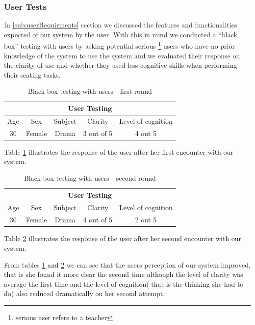 \subsubsection{User Tests} \label{sub:user-testing}
In \ref{sub:userRequirments} section we discussed the features and functionalities expected of our system by the user. With this in mind we conducted a ``black box'' testing with users by asking potential serious \footnote{ serious user refers to a teacher} users who have no prior knowledge of the system to use the system and we evaluated their response on the clarity of use and whether they used less cognitive skills when performing their seating tasks.
\begin{table}
    \begin{tabular}{|c|c|c|c|c|}
        \hline
        \multicolumn{5}{|c|}{User Testing} \\
        \hline
        Age & Sex & Subject & Clarity & Level of cognition \\
        \hline
        30  & Female & Drama & 3 out of 5 & 4 out 5\\
        \hline
    \end{tabular}
    \caption{\label{tab:user-testing1} Black box testing with users - first round}
\end{table}


Table \ref{tab:user-testing1} illustrates the response of the user after her first encounter with our system.
\begin{table}
    \begin{tabular}{|c|c|c|c|c|}
        \hline
        \multicolumn{5}{|c|}{User Testing} \\
        \hline
        Age & Sex & Subject & Clarity & Level of cognition \\
        \hline
        30  & Female & Drama & 4 out of 5 & 2 out 5\\
        \hline
    \end{tabular}
    \caption{\label{tab:user-testing2} Black box testing with users - second round}
\end{table}


Table \ref{tab:user-testing2} illustrates the response of the user after her second encounter with our system.

From tables \ref{tab:user-testing1} and \ref{tab:user-testing2} we can see that the users perception of our system improved, that is she found it more clear the second time although the level of clarity was average the first time and the level of cognition( that is the thinking she had to do) also reduced dramatically on her second attempt. 

